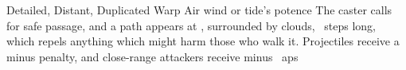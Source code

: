   {Detailed, Distant, Duplicated}%
  {Warp}%
  {Air}%
  {wind or tide's potence}%
  {The caster calls for safe passage, and a path appears at \spellRange, surrounded by clouds, ~\glspl{step} long, which repels anything which might harm those who walk it.
  Projectiles receive a minus  penalty, and close-range attackers receive minus ~\glspl{ap}}%
  {}
